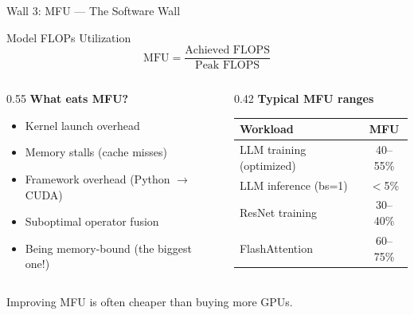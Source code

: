 \documentclass[aspectratio=169, 12pt]{beamer}
\newcommand{\wallbox}[2]{%
  \begin{block}{#1}#2\end{block}%
}
\begin{document}
\begin{frame}[shrink]{Wall 3: MFU --- The Software Wall}

\small
\wallbox{Model FLOPs Utilization}{
\[
  \text{MFU} = \frac{\text{Achieved FLOPS}}{\text{Peak FLOPS}}
\]
}

\vspace{0.2cm}
\begin{columns}[T]
\begin{column}{0.55\textwidth}
\textbf{What eats MFU?}
\begin{itemize}\setlength\itemsep{2pt}
  \item Kernel launch overhead
  \item Memory stalls (cache misses)
  \item Framework overhead (Python $\to$ CUDA)
  \item Suboptimal operator fusion
  \item \alert{Being memory-bound} (the biggest one!)
\end{itemize}
\end{column}
\begin{column}{0.42\textwidth}
\centering
\textbf{Typical MFU ranges}\\[4pt]
\scriptsize
\begin{tabular}{lc}
\toprule
Workload & MFU \\
\midrule
LLM training (optimized) & 40--55\% \\
LLM inference (bs=1) & $<$5\% \\
ResNet training & 30--40\% \\
FlashAttention & 60--75\% \\
\bottomrule
\end{tabular}
\end{column}
\end{columns}

\vspace{0.2cm}
\alert{Improving MFU is often cheaper than buying more GPUs.}
\end{frame}
\end{document}
